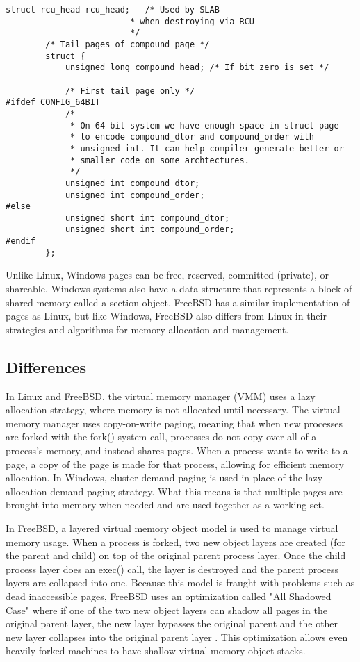 \documentclass[journal, letterpaper, draftclsnofoot, onecolumn, 10pt]{IEEEtran}
\begin{document}
\begin{lstlisting}[frame=single, basicstyle=\small]
		struct rcu_head rcu_head;	/* Used by SLAB
						 * when destroying via RCU
						 */
		/* Tail pages of compound page */
		struct {
			unsigned long compound_head; /* If bit zero is set */

			/* First tail page only */
#ifdef CONFIG_64BIT
			/*
			 * On 64 bit system we have enough space in struct page
			 * to encode compound_dtor and compound_order with
			 * unsigned int. It can help compiler generate better or
			 * smaller code on some archtectures.
			 */
			unsigned int compound_dtor;
			unsigned int compound_order;
#else
			unsigned short int compound_dtor;
			unsigned short int compound_order;
#endif
		};
    \end{lstlisting}



Unlike Linux, Windows pages can be free, reserved, committed (private), or shareable. Windows systems also have a data structure that represents a block of shared memory called a section object. FreeBSD has a similar implementation of pages as Linux, but like Windows, FreeBSD also differs from Linux in their strategies and algorithms for memory allocation and management.

\subsection{Differences}

In Linux and FreeBSD, the virtual memory manager (VMM) uses a lazy allocation strategy, where memory is not allocated until necessary. The virtual memory manager uses copy-on-write paging, meaning that when new processes are forked with the fork() system call, processes do not copy over all of a process's memory, and instead shares pages. When a process wants to write to a page, a copy of the page is made for that process, allowing for efficient memory allocation.
In Windows, cluster demand paging is used in place of the lazy allocation demand paging strategy. What this means is that multiple pages are brought into memory when needed and are used together as a working set. \cite{linux}

In FreeBSD, a layered virtual memory object model is used to manage virtual memory usage. When a process is forked, two new object layers are created (for the parent and child) on top of the original parent process layer. Once the child process layer does an exec() call, the layer is destroyed and the parent process layers are collapsed into one.
Because this model is fraught with problems such as dead inaccessible pages, FreeBSD uses an optimization called "All Shadowed Case" where if one of the two new object layers can shadow all pages in the original parent layer, the new layer bypasses the original parent and the other new layer collapses into the original parent layer \cite{freebsd}. This optimization allows even heavily forked machines to have shallow virtual memory object stacks.
\end{document}
